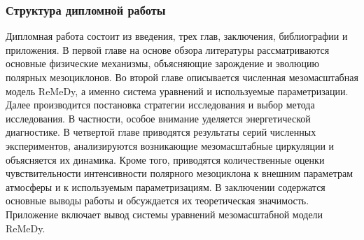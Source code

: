 \subsubsection*{Структура дипломной работы}
Дипломная работа состоит из введения, трех глав, заключения, библиографии и приложения. В первой главе на основе обзора литературы рассматриваются основные физические механизмы, объясняющие зарождение и эволюцию полярных мезоциклонов. Во второй главе описывается численная мезомасштабная модель ReMeDy, а именно система уравнений и используемые параметризации. Далее производится постановка стратегии исследования и выбор метода исследования. В частности, особое внимание уделяется энергетической диагностике. В четвертой главе приводятся результаты серий численных экспериментов, анализируются возникающие мезомасштабные циркуляции и объясняется их динамика. Кроме того, приводятся количественные оценки чувствительности интенсивности полярного мезоциклона к внешним параметрам атмосферы и к используемым параметризациям. В заключении содержатся основные выводы работы и обсуждается их теоретическая значимость. Приложение включает вывод системы уравнений мезомасштабной модели ReMeDy.

%
